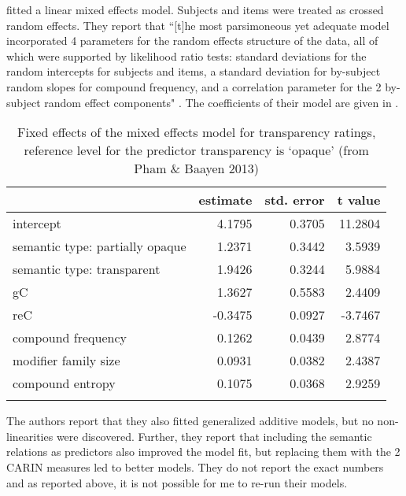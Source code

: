 \label{sec:phanbaayenregress}
\citet{PhamandBaayen:2013} fitted a linear mixed effects
model. Subjects and items were treated as crossed random effects. They
report that ``[t]he most parsimoneous yet adequate model incorporated 4 parameters for the
random effects structure of the data, all of which were supported by likelihood
ratio tests: standard deviations for the random intercepts for subjects and items, a
standard deviation for by-subject random slopes for compound frequency, and a
correlation parameter for the 2 by-subject random effect
components" \citep[467]{PhamandBaayen:2013}. 
The coefficients of their model are given in .

\begin{table}[!htb]
  \centering
  \begin{tabular}{lrrr}\lsptoprule
                 &estimate &std. error&t value\\\midrule
intercept &4.1795&0.3705&11.2804\\
semantic type: partially opaque&1.2371&0.3442&3.5939\\
semantic type: transparent&1.9426&0.3244&5.9884\\
gC&1.3627&0.5583&2.4409\\
reC&-0.3475&0.0927&-3.7467\\
compound frequency&0.1262&0.0439&2.8774\\
modifier family size&0.0931&0.0382&2.4387\\
compound entropy&0.1075&0.0368&2.9259\\\lspbottomrule

    
  \end{tabular}
  \caption{Fixed effects of the mixed effects model for transparency ratings, reference
    level for the predictor transparency is `opaque' (from Pham \&
    Baayen 2013)}
\label{tab:phambaayentrans}
\end{table}

The authors report that they also fitted generalized additive models, but no non-\-linearities
were discovered. Further, they report that including the semantic
relations as predictors also improved the model fit, but replacing them with the 2 CARIN measures led to
better models. They do not report the exact numbers and as
reported above, it is not possible for me to re-run their
models. 

